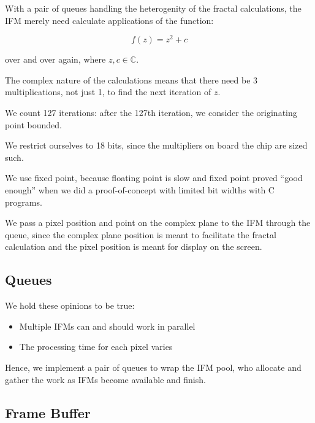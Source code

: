 \documentclass{article}
\begin{document}
With a pair of queues handling the heterogenity of the fractal
calculations, the IFM merely need calculate applications of the function:

\begin{equation}
f(z) = z^2 + c
\end{equation}

over and over again, where $z,c \in \mathbb{C}$.


The complex nature of the calculations means that there need be 3
multiplications, not just 1, to find the next iteration of $z$.

We count 127 iterations: after the 127th iteration, we consider the
originating point bounded.

We restrict ourselves to 18 bits, since the multipliers on board the
chip are sized such.

We use fixed point, because floating point is slow and fixed point
proved ``good enough'' when we did a proof-of-concept with limited bit
widths with C programs.

We pass a pixel position and point on the complex plane to the IFM
through the queue, since the complex plane position is meant to
facilitate the fractal calculation and the pixel position is meant for
display on the screen.

\subsection{Queues}

We hold these opinions to be true:

\begin{itemize}
\item Multiple IFMs can and should work in parallel
\item The processing time for each pixel varies
\end{itemize}

Hence, we implement a pair of queues to wrap the IFM pool, who
allocate and gather the work as IFMs become available and finish.



\subsection{Frame Buffer}
\end{document}

